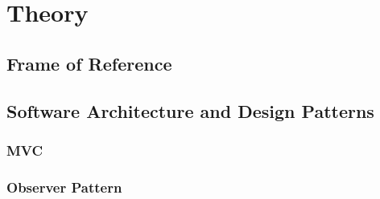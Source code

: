 \chapter{Theory}
\label{chap:theory}



\section{Frame of Reference}

\section{Software Architecture and Design Patterns}
\subsection{MVC}
\subsection{Observer Pattern}



